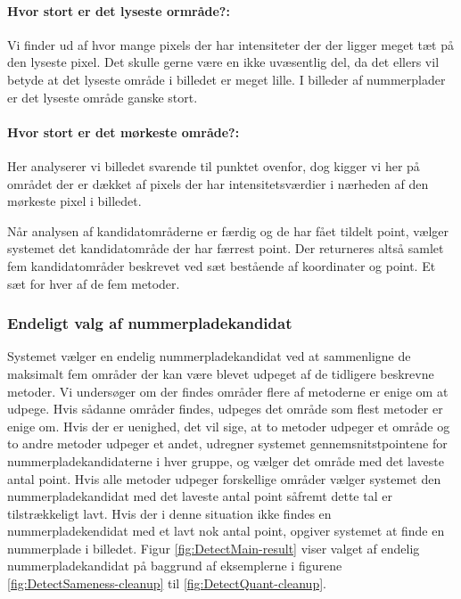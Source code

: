 \paragraph*{Hvor stort er det lyseste ormråde?:}
Vi finder ud af hvor mange pixels der har intensiteter der der ligger meget tæt på den lyseste pixel. Det skulle gerne være en ikke uvæsentlig del, da det ellers vil betyde at det lyseste område i billedet er meget lille. I billeder af nummerplader er det lyseste område ganske stort. 

\paragraph*{Hvor stort er det mørkeste område?:}
Her analyserer vi billedet svarende til punktet ovenfor, dog kigger vi her på området der er dækket af pixels der har intensitetsværdier i nærheden af den mørkeste pixel i billedet.

Når analysen af kandidatområderne er færdig og de har fået tildelt point, vælger systemet det kandidatområde der har færrest point. Der returneres altså samlet fem kandidatområder beskrevet ved sæt bestående af koordinater og point. Et sæt for hver af de fem metoder.

\subsubsection{Endeligt valg af nummerpladekandidat}
Systemet vælger en endelig nummerpladekandidat ved at sammenligne de maksimalt fem områder der kan være blevet udpeget af de tidligere beskrevne metoder. Vi undersøger om der findes områder flere af metoderne er enige om at udpege. Hvis sådanne områder findes, udpeges det område som flest metoder er enige om. Hvis der er uenighed, det vil sige, at to metoder udpeger et område og to andre metoder udpeger et andet,  udregner systemet gennemsnitstpointene for nummerpladekandidaterne i hver gruppe, og vælger det område med det laveste antal point. Hvis alle metoder udpeger forskellige områder vælger systemet den nummerpladekandidat med det laveste antal point såfremt dette tal er tilstrækkeligt lavt. Hvis der i denne situation ikke findes en nummerpladekendidat med et lavt nok antal point, opgiver systemet at finde en nummerplade i billedet. Figur \ref{fig:DetectMain-result} viser valget af endelig nummerpladekandidat på baggrund af eksemplerne i figurene \ref{fig:DetectSameness-cleanup} til \vref{fig:DetectQuant-cleanup}.

